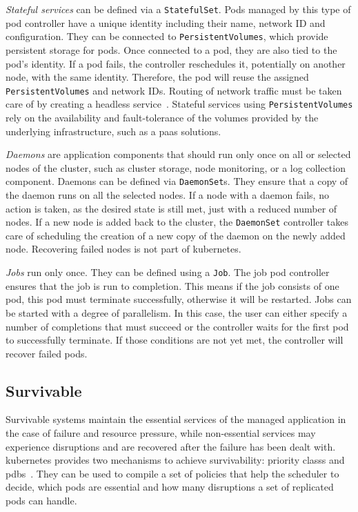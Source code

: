   \textit{Stateful services} can be defined via a \texttt{StatefulSet}.
  Pods managed by this type of \gls{pod controller} have a unique identity including their name, network ID and configuration.
  They can be connected to \texttt{PersistentVolumes}, which provide persistent storage for pods.
  Once connected to a pod, they are also tied to the pod's identity.
  If a pod fails, the controller reschedules it, potentially on another node, with the same identity.
  Therefore, the pod will reuse the assigned \texttt{PersistentVolumes} and network IDs.
  Routing of network traffic must be taken care of by creating a headless \gls{service}~\cite{kubernetesdoc}.
  Stateful services using \texttt{PersistentVolumes} rely on the availability and fault-tolerance of the volumes provided by the underlying infrastructure, such as a \gls{paas} solutions.

  \textit{Daemons} are application components that should run only once on all or selected nodes of the cluster, such as cluster storage, node monitoring, or a log collection component.
  Daemons can be defined via \texttt{DaemonSet}s.
  They ensure that a copy of the daemon runs on all the selected nodes.
  If a node with a daemon fails, no action is taken, as the desired state is still met, just with a reduced number of nodes.
  If a new node is added back to the cluster, the \texttt{DaemonSet} controller takes care of scheduling the creation of a new copy of the daemon on the newly added node.
  Recovering failed nodes is not part of \gls{kubernetes}.

  \textit{Jobs} run only once.
  They can be defined using a \texttt{Job}.
  The job \gls{pod controller} ensures that the job is run to completion.
  This means if the job consists of one pod, this pod must terminate successfully, otherwise it will be restarted.
  Jobs can be started with a degree of parallelism.
  In this case, the user can either specify a number of completions that must succeed or the controller waits for the first pod to successfully terminate.
  If those conditions are not yet met, the controller will recover failed pods.

\subsection{Survivable}\label{sec:self-healing-kubernetes:survivable}
  Survivable systems maintain the essential services of the managed application in the case of failure and resource pressure, while non-essential services may experience disruptions and are recovered after the failure has been dealt with.
  \Gls{kubernetes} provides two mechanisms to achieve survivability: \glspl{priority class} and \glspl{pdb}~\cite{kubernetesdoc}.
  They can be used to compile a set of policies that help the scheduler to decide, which pods are essential and how many disruptions a set of replicated pods can handle.

